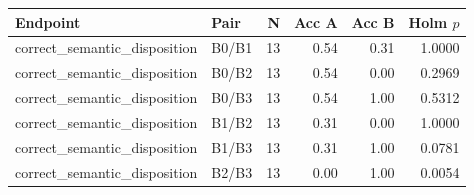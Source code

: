 \begin{tabular}{llrrrr}
\toprule
Endpoint & Pair & N & Acc A & Acc B & Holm $p$ \\
\midrule
correct_semantic_disposition & B0/B1 & 13 & 0.54 & 0.31 & 1.0000 \\
correct_semantic_disposition & B0/B2 & 13 & 0.54 & 0.00 & 0.2969 \\
correct_semantic_disposition & B0/B3 & 13 & 0.54 & 1.00 & 0.5312 \\
correct_semantic_disposition & B1/B2 & 13 & 0.31 & 0.00 & 1.0000 \\
correct_semantic_disposition & B1/B3 & 13 & 0.31 & 1.00 & 0.0781 \\
correct_semantic_disposition & B2/B3 & 13 & 0.00 & 1.00 & 0.0054 \\
\bottomrule
\end{tabular}
